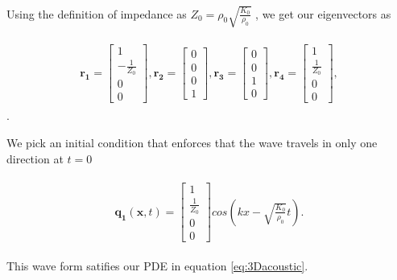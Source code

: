 Using the definition of impedance as $Z_0 = \rho_0 \sqrt{\frac{K_0}{\rho_0}}$ , we get our eigenvectors as

\begin{align}
    \begin{split}
    \mathbf{r_1} = \begin{bmatrix}
        1 \\
-\frac{1}{Z_0} \\
0 \\
0
        \end{bmatrix},
        \mathbf{r_2} = \begin{bmatrix}
            0 \\
0 \\
0 \\
1
            \end{bmatrix},
            \mathbf{r_3} = \begin{bmatrix}
                0 \\
                0 \\
                1 \\
                0
                \end{bmatrix},
                \mathbf{r_4} = \begin{bmatrix}
                    1 \\
                    \frac{1}{Z_0} \\
                    0 \\
                    0                    
                \end{bmatrix},
    \end{split}
\end{align} .

We pick an initial condition that enforces that the wave travels in only one direction at $t=0$

\begin{align}
    \begin{split}
        \mathbf{q_1}\left(\mathbf{x}, t\right) = \begin{bmatrix}
            1 \\
            \frac{1}{Z_0} \\
            0 \\
            0
            \end{bmatrix} cos\left(kx - \sqrt{\frac{K_{0}}{\rho_{0}}}t\right) .
    \end{split}
\end{align}

This wave form satifies our PDE in equation \ref{eq:3Dacoustic}.

